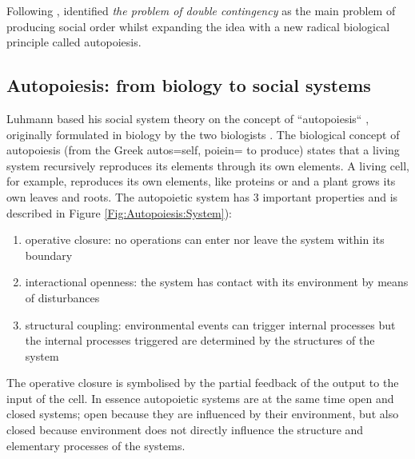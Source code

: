 Following \citet{Talcott1968:SocioTheory}, \citet{Luhmann95}
identified \textit{the problem of double contingency} as the main problem of
producing social order whilst expanding the idea with a new radical biological
principle called autopoiesis.

\subsection{Autopoiesis: from biology to social systems}
Luhmann based his social system theory on the concept of ``autopoiesis`` ,
originally formulated in biology by the two biologists \citet{Maturana1980}.
The biological concept of autopoiesis (from the Greek autos=self, poiein= to produce)
states that a living system recursively reproduces its elements through its own elements.
A living cell, for example, reproduces its own elements, like proteins or
and a plant grows its own leaves and roots.
The autopoietic system has 3 important properties and is described in Figure \ref{Fig:Autopoiesis:System}):
\begin{enumerate}
 \item operative closure: no operations can enter nor leave the system within its boundary
 \item interactional openness: the system has contact with its environment by means of disturbances
 \item structural coupling: environmental events can trigger internal processes but the internal
processes triggered are determined by the structures of the system
\end{enumerate}
The operative closure is symbolised by the partial feedback of the output to the 
input of the cell.
In essence autopoietic systems are at the same time open and closed systems;
open because they are influenced by their environment,
but also closed because environment does not directly
influence the structure and elementary processes of the systems.

